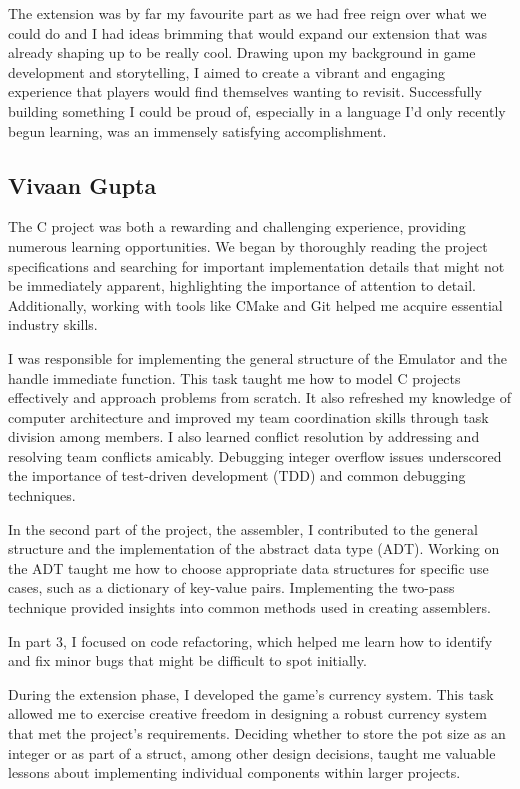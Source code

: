 \documentclass[9pt,a4paper,twoside]{tau-class/tau}
\begin{document}
    The extension was by far my favourite part as we had free reign over what we could do and I had ideas brimming that would expand our extension that was already shaping up to be really cool. Drawing upon my background in game development and storytelling, I aimed to create a vibrant and engaging experience that players would find themselves wanting to revisit. Successfully building something I could be proud of, especially in a language I'd only recently begun learning, was an immensely satisfying accomplishment. 
    
    \subsection{Vivaan Gupta} 
    
    The C project was both a rewarding and challenging experience, providing numerous learning opportunities. We began by thoroughly reading the project specifications and searching for important implementation details that might not be immediately apparent, highlighting the importance of attention to detail. Additionally, working with tools like CMake and Git helped me acquire essential industry skills.

    I was responsible for implementing the general structure of the Emulator and the handle immediate function. This task taught me how to model C projects effectively and approach problems from scratch. It also refreshed my knowledge of computer architecture and improved my team coordination skills through task division among members. I also learned conflict resolution by addressing and resolving team conflicts amicably. Debugging integer overflow issues underscored the importance of test-driven development (TDD) and common debugging techniques.
    
    In the second part of the project, the assembler, I contributed to the general structure and the implementation of the abstract data type (ADT). Working on the ADT taught me how to choose appropriate data structures for specific use cases, such as a dictionary of key-value pairs. Implementing the two-pass technique provided insights into common methods used in creating assemblers.
    
    In part 3, I focused on code refactoring, which helped me learn how to identify and fix minor bugs that might be difficult to spot initially.
    
    During the extension phase, I developed the game's currency system. This task allowed me to exercise creative freedom in designing a robust currency system that met the project's requirements. Deciding whether to store the pot size as an integer or as part of a struct, among other design decisions, taught me valuable lessons about implementing individual components within larger projects.
    
\end{document}
